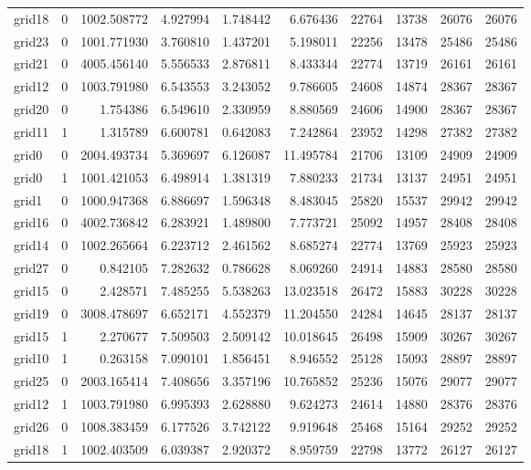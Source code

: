 \begin{longtable}{|l|r|r|r|r|r|r|r|r|r|}
grid18 & 0 & 1002.508772 & 4.927994 & 1.748442 & 6.676436 & 22764 & 13738 & 26076 & 26076 \\
grid23 & 0 & 1001.771930 & 3.760810 & 1.437201 & 5.198011 & 22256 & 13478 & 25486 & 25486 \\
grid21 & 0 & 4005.456140 & 5.556533 & 2.876811 & 8.433344 & 22774 & 13719 & 26161 & 26161 \\
grid12 & 0 & 1003.791980 & 6.543553 & 3.243052 & 9.786605 & 24608 & 14874 & 28367 & 28367 \\
grid20 & 0 & 1.754386 & 6.549610 & 2.330959 & 8.880569 & 24606 & 14900 & 28367 & 28367 \\
grid11 & 1 & 1.315789 & 6.600781 & 0.642083 & 7.242864 & 23952 & 14298 & 27382 & 27382 \\
grid0 & 0 & 2004.493734 & 5.369697 & 6.126087 & 11.495784 & 21706 & 13109 & 24909 & 24909 \\
grid0 & 1 & 1001.421053 & 6.498914 & 1.381319 & 7.880233 & 21734 & 13137 & 24951 & 24951 \\
grid1 & 0 & 1000.947368 & 6.886697 & 1.596348 & 8.483045 & 25820 & 15537 & 29942 & 29942 \\
grid16 & 0 & 4002.736842 & 6.283921 & 1.489800 & 7.773721 & 25092 & 14957 & 28408 & 28408 \\
grid14 & 0 & 1002.265664 & 6.223712 & 2.461562 & 8.685274 & 22774 & 13769 & 25923 & 25923 \\
grid27 & 0 & 0.842105 & 7.282632 & 0.786628 & 8.069260 & 24914 & 14883 & 28580 & 28580 \\
grid15 & 0 & 2.428571 & 7.485255 & 5.538263 & 13.023518 & 26472 & 15883 & 30228 & 30228 \\
grid19 & 0 & 3008.478697 & 6.652171 & 4.552379 & 11.204550 & 24284 & 14645 & 28137 & 28137 \\
grid15 & 1 & 2.270677 & 7.509503 & 2.509142 & 10.018645 & 26498 & 15909 & 30267 & 30267 \\
grid10 & 1 & 0.263158 & 7.090101 & 1.856451 & 8.946552 & 25128 & 15093 & 28897 & 28897 \\
grid25 & 0 & 2003.165414 & 7.408656 & 3.357196 & 10.765852 & 25236 & 15076 & 29077 & 29077 \\
grid12 & 1 & 1003.791980 & 6.995393 & 2.628880 & 9.624273 & 24614 & 14880 & 28376 & 28376 \\
grid26 & 0 & 1008.383459 & 6.177526 & 3.742122 & 9.919648 & 25468 & 15164 & 29252 & 29252 \\
grid18 & 1 & 1002.403509 & 6.039387 & 2.920372 & 8.959759 & 22798 & 13772 & 26127 & 26127 \\

\end{longtable}
